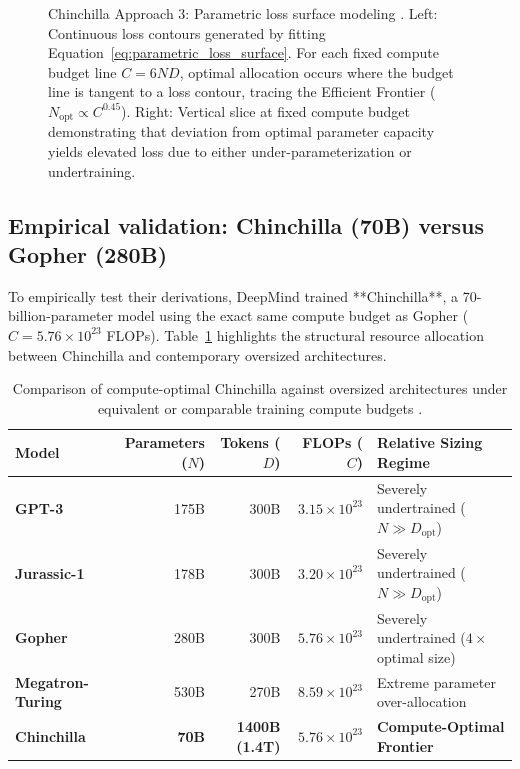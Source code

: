 \documentclass[../../main.tex]{subfiles}
\begin{document}
\begin{figure}[htbp]
\caption{Chinchilla Approach 3: Parametric loss surface modeling \cite{hoffmann2022}. Left: Continuous loss contours generated by fitting Equation~\eqref{eq:parametric_loss_surface}. For each fixed compute budget line $C = 6ND$, optimal allocation occurs where the budget line is tangent to a loss contour, tracing the Efficient Frontier ($N_{\text{opt}} \propto C^{0.45}$). Right: Vertical slice at fixed compute budget demonstrating that deviation from optimal parameter capacity yields elevated loss due to either under-parameterization or undertraining.}
\label{fig:chinchilla_approach3}
\end{figure}


\subsection{Empirical validation: Chinchilla (70B) versus Gopher (280B)}
\label{subsec:chinchilla_validation}

To empirically test their derivations, DeepMind trained **Chinchilla**, a 70-billion-parameter model using the exact same compute budget as Gopher ($C = 5.76 \times 10^{23}$ FLOPs). Table~\ref{tab:chinchilla_vs_gopher} highlights the structural resource allocation between Chinchilla and contemporary oversized architectures.

\begin{table}[t]
\centering
\caption{Comparison of compute-optimal Chinchilla against oversized architectures under equivalent or comparable training compute budgets \cite{hoffmann2022}.}
\label{tab:chinchilla_vs_gopher}
\begin{tabularx}{\textwidth}{l r r r X}
\toprule
\textbf{Model} & \textbf{Parameters ($N$)} & \textbf{Tokens ($D$)} & \textbf{FLOPs ($C$)} & \textbf{Relative Sizing Regime} \\
\midrule
\textbf{GPT-3} & 175B & 300B & $3.15 \times 10^{23}$ & Severely undertrained ($N \gg D_{\text{opt}}$) \\
\textbf{Jurassic-1} & 178B & 300B & $3.20 \times 10^{23}$ & Severely undertrained ($N \gg D_{\text{opt}}$) \\
\textbf{Gopher} & 280B & 300B & $5.76 \times 10^{23}$ & Severely undertrained ($4\times$ optimal size) \\
\textbf{Megatron-Turing} & 530B & 270B & $8.59 \times 10^{23}$ & Extreme parameter over-allocation \\
\midrule
\textbf{Chinchilla} & \textbf{70B} & \textbf{1400B (1.4T)} & \textbf{$5.76 \times 10^{23}$} & \textbf{Compute-Optimal Frontier} \\
\bottomrule
\end{tabularx}
\end{table}
\end{document}
